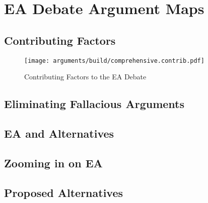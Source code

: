 \chapter{EA Debate Argument Maps}
\label{chap-arguments}


\section{Contributing Factors}

\begin{sidewaysfigure}[h]
  \centering\CaptionFontSize
  \texttt{[image: arguments/build/comprehensive.contrib.pdf]}
  \caption[Contributing Factors to the EA Debate]{Contributing Factors to the EA Debate}
  \label{fig-args-contrib}
\end{sidewaysfigure}

\section{Eliminating Fallacious Arguments}

\section{EA and Alternatives}

\section{Zooming in on EA}




\section{Proposed Alternatives}

